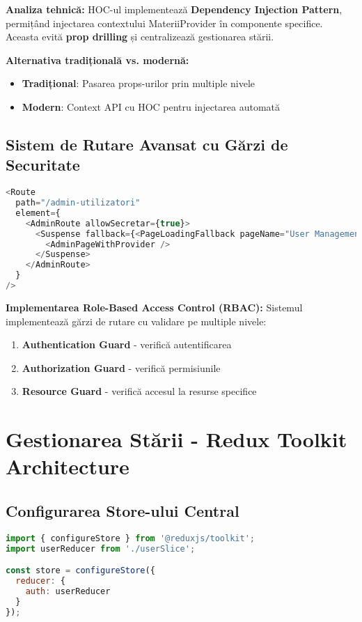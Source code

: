 \documentclass[11pt,a4paper]{article}
\begin{document}
\textbf{Analiza tehnică:} HOC-ul implementează \textbf{Dependency Injection Pattern}, permițând injectarea contextului MateriiProvider în componente specifice. Aceasta evită \textbf{prop drilling} și centralizează gestionarea stării.

\textbf{Alternativa tradițională vs. modernă:}
\begin{itemize}
    \item \textbf{Tradițional}: Pasarea props-urilor prin multiple nivele
    \item \textbf{Modern}: Context API cu HOC pentru injectarea automată
\end{itemize}

\subsection{Sistem de Rutare Avansat cu Gărzi de Securitate}

\begin{lstlisting}[language=JavaScript, caption=Route Guards Implementation]
<Route 
  path="/admin-utilizatori" 
  element={
    <AdminRoute allowSecretar={true}>
      <Suspense fallback={<PageLoadingFallback pageName="User Management" />}>
        <AdminPageWithProvider />
      </Suspense>
    </AdminRoute>
  } 
/>
\end{lstlisting}

\textbf{Implementarea Role-Based Access Control (RBAC):} Sistemul implementează gărzi de rutare cu validare pe multiple nivele:
\begin{enumerate}
    \item \textbf{Authentication Guard} - verifică autentificarea
    \item \textbf{Authorization Guard} - verifică permisiunile
    \item \textbf{Resource Guard} - verifică accesul la resurse specifice
\end{enumerate}

\section{Gestionarea Stării - Redux Toolkit Architecture}

\subsection{Configurarea Store-ului Central}

\begin{lstlisting}[language=JavaScript, caption=Redux Store Configuration]
import { configureStore } from '@reduxjs/toolkit';
import userReducer from './userSlice';

const store = configureStore({
  reducer: {
    auth: userReducer
  }
});
\end{lstlisting}
\end{document}
